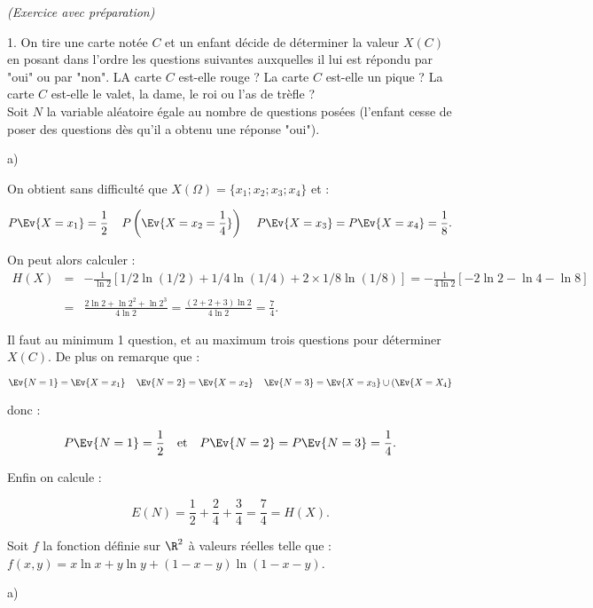 \documentclass[11pt]{article}%
\begin{document}
\begin{exercice}{\it (Exercice avec préparation)}
\begin{noliste}{1.}
 On tire une carte notée $C$ et un enfant décide de déterminer la
valeur $X(C)$ en posant dans l'ordre les questions suivantes auxquelles
il lui est répondu par "oui" ou par "non". LA carte $C$ est-elle rouge
? La carte $C$ est-elle un pique ? La carte $C$ est-elle le valet, la
dame, le roi ou l'as de trèfle ? \\
 Soit $N$ la variable aléatoire égale au nombre de questions posées
(l'enfant cesse de poser des questions dès qu'il a obtenu une réponse
"oui"). \begin{noliste}{a)}
 \setlength{\itemsep}{2mm}

 \item On obtient sans difficulté que $X ( \Omega ) = \{ x_{1} ; x_{2}
; x_{3} ; x_{4} \}$ et : 
 
\[
P \Ev{ X = x_{1} } = \frac{1}{2} \ \, \ \ P \left(\Ev{ X = x_{2} =
    \frac{1}{4}}\right) \ \, \ \ P \Ev{ X = x_{3} } = P \Ev{ X = x_{4} } =
  \frac{ 1 }{ 8 }.
\] 


On peut alors calculer :
 \begin{eqnarray*}
 H ( X ) & = & - \frac{ 1 }{ \ln 2 } [ 1/2 \ln (1/2) + 1/4 \ln (1/4) +
2 \times 1/8 \ln (1/8) ] = - \frac{ 1 }{ 4 \ln 2 } [ - 2 \ln 2 - \ln 4
- \ln 8 ] \\
\\
 & = & \frac{ 2 \ln 2 + \ln 2^{2} + \ln 2^{3} }{ 4 \ln 2 } = \frac{ (2
+ 2 + 3) \ln 2 }{ 4 \ln 2 } = \frac{ 7 }{ 4 }. 
 \end{eqnarray*}

 \item Il faut au minimum 1 question, et au maximum trois questions
pour déterminer $X ( C )$. De plus on remarque que : 
 
\[
 \Ev{N = 1 } = \Ev{ X = x_{1} } \ \, \ \ \Ev{ N = 2 } = \Ev{ X = x_{2}}
\ \, \ \ \Ev{ N = 3 } = \Ev{ X = x_{3} } \cup ( \Ev{X = X_{4} } 
\]

 donc : 



\[
 P \Ev{ N = 1 } = \frac{ 1 }{ 2 } \ \ \text{ et } \ \ P \Ev{ N = 2} = P
\Ev{ N = 3 } = \frac{ 1 }{ 4 }. 
\]

 Enfin on calcule : 
 
\[
 E ( N ) = \frac{ 1 }{ 2 } + \frac{ 2 }{ 4 } + \frac{ 3 }{ 4 } = \frac{
7 }{ 4 } = H ( X ). 
\]

 \end{noliste}

 \item Soit $f$ la fonction définie sur $\R^{2}$ à valeurs réelles
telle que : $f(x,y) = x \ln x + y \ln y + (1-x-y) \ln (1-x-y)$.
\begin{noliste}{a)}
 \setlength{\itemsep}{2mm}


\end{noliste}
\end{noliste}
\end{exercice}
\end{document}
